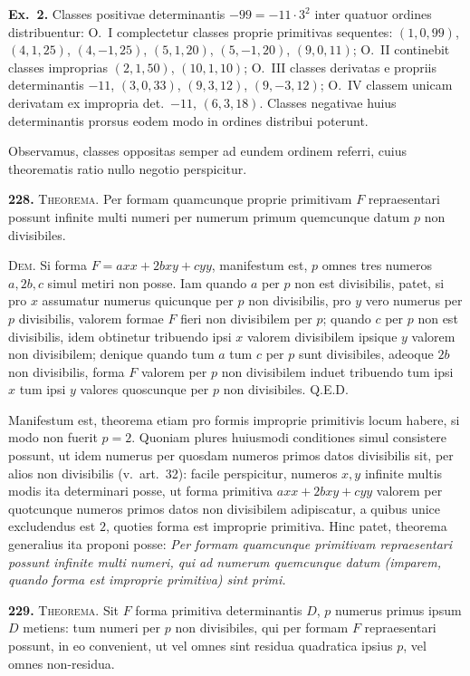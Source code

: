 \documentclass[12pt,a4paper]{article}
\theoremstyle{plain}
\theoremstyle{definition}
\theoremstyle{remark}
\begin{document}
\textbf{Ex.~2.} Classes positivae determinantis $-99=-11\cdot3^2$ inter quatuor ordines distribuentur: O.\ I complectetur classes proprie primitivas sequentes: $(1,0,99)$, $(4,1,25)$, $(4,-1,25)$, $(5,1,20)$, $(5,-1,20)$, $(9,0,11)$; O.\ II continebit classes improprias $(2,1,50)$, $(10,1,10)$; O.\ III classes derivatas e propriis determinantis $-11$, $(3,0,33)$, $(9,3,12)$, $(9,-3,12)$; O.\ IV classem unicam derivatam ex impropria det.\ $-11$, $(6,3,18)$. Classes negativae huius determinantis prorsus eodem modo in ordines distribui poterunt.

Observamus, classes oppositas semper ad eundem ordinem referri, cuius theorematis ratio nullo negotio perspicitur.

\textbf{228.} \textsc{Theorema.} Per formam quamcunque proprie primitivam $F$ repraesentari possunt infinite multi numeri per numerum primum quemcunque datum $p$ non divisibiles.

\textsc{Dem.} Si forma $F=axx+2bxy+cyy$, manifestum est, $p$ omnes tres numeros $a,2b,c$ simul metiri non posse. Iam quando $a$ per $p$ non est divisibilis, patet, si pro $x$ assumatur numerus quicunque per $p$ non divisibilis, pro $y$ vero numerus per $p$ divisibilis, valorem formae $F$ fieri non divisibilem per $p$; quando $c$ per $p$ non est divisibilis, idem obtinetur tribuendo ipsi $x$ valorem divisibilem ipsique $y$ valorem non divisibilem; denique quando tum $a$ tum $c$ per $p$ sunt divisibiles, adeoque $2b$ non divisibilis, forma $F$ valorem per $p$ non divisibilem induet tribuendo tum ipsi $x$ tum ipsi $y$ valores quoscunque per $p$ non divisibiles. Q.E.D.

Manifestum est, theorema etiam pro formis improprie primitivis locum habere, si modo non fuerit $p=2$. Quoniam plures huiusmodi conditiones simul consistere possunt, ut idem numerus per quosdam numeros primos datos divisibilis sit, per alios non divisibilis (v.\ art.~32): facile perspicitur, numeros $x,y$ infinite multis modis ita determinari posse, ut forma primitiva $axx+2bxy+cyy$ valorem per quotcunque numeros primos datos non divisibilem adipiscatur, a quibus unice excludendus est $2$, quoties forma est improprie primitiva. Hinc patet, theorema generalius ita proponi posse: \emph{Per formam quamcunque primitivam repraesentari possunt infinite multi numeri, qui ad numerum quemcunque datum (imparem, quando forma est improprie primitiva) sint primi.}

\textbf{229.} \textsc{Theorema.} Sit $F$ forma primitiva determinantis $D$, $p$ numerus primus ipsum $D$ metiens: tum numeri per $p$ non divisibiles, qui per formam $F$ repraesentari possunt, in eo convenient, ut vel omnes sint residua quadratica ipsius $p$, vel omnes non-residua.
\end{document}
